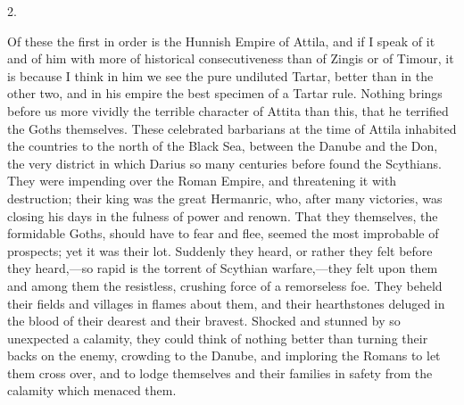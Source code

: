 2.

Of these the first in order is
the Hunnish Empire of Attila, and if I speak of it and of him with
more of historical consecutiveness than of Zingis or of Timour, it is
because I think in him we see the pure undiluted Tartar, better than
in the other two, and in his empire the best specimen of a Tartar
rule. Nothing brings before us more vividly the terrible character of
Attita than this, that he terrified the Goths themselves. These
celebrated barbarians at the time of Attila inhabited the countries to
the north of the Black Sea, between the Danube and the Don, the very
district in which Darius so many centuries before found the
Scythians. They were impending over the Roman Empire, and threatening
it with destruction; their king was the great Hermanric, who, after
many victories, was closing his days in the fulness of power and
renown. That they themselves, the formidable Goths, should have to
fear and flee, seemed the most improbable of prospects; yet it was
their lot. Suddenly they heard, or rather they felt before they
heard,—so rapid is the torrent of Scythian warfare,—they felt upon
them and among them the resistless, crushing force of a remorseless
foe. They beheld their fields and villages in flames about them, and
their hearthstones deluged in the blood of their dearest and their
bravest. Shocked and stunned by so unexpected a calamity, they could
think of nothing better than turning their backs on the enemy,
crowding to the Danube, and imploring the Romans to let them cross
over, and to lodge themselves and their families in safety from the
calamity which menaced them.

